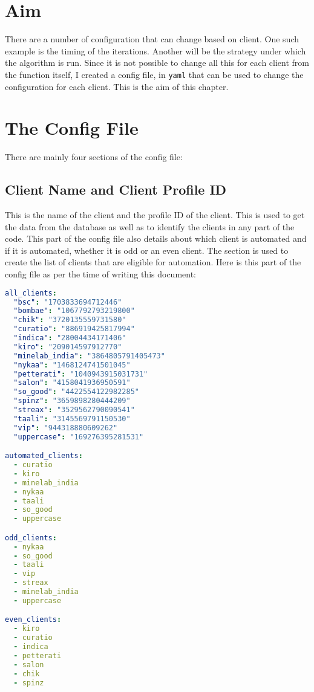 \section{Aim}

There are a number of configuration that can change based on client. One such example is the timing of the iterations. Another will be the strategy under which the algorithm is run. Since it is not possible to change all this for each client from the function itself, I created a config file, in \verb|yaml| that can be used to change the configuration for each client. This is the aim of this chapter.

\section{The Config File}

There are mainly four sections of the config file:

\subsection{Client Name and Client Profile ID}

This is the name of the client and the profile ID of the client. This is used to get the data from the database as well as to identify the clients in any part of the code. This part of the config file also details about which client is automated and if it is automated, whether it is odd or an even client. The section is used to create the list of clients that are eligible for automation. Here is this part of the config file as per the time of writing this document:

\begin{lstlisting}[language=yaml]
all_clients:
  "bsc": "1703833694712446"
  "bombae": "1067792793219800"
  "chik": "3720135559731580"
  "curatio": "886919425817994"
  "indica": "28004434171406"
  "kiro": "209014597912770"
  "minelab_india": "3864805791405473"
  "nykaa": "1468124741501045"
  "petterati": "1040943915031731"
  "salon": "4158041936950591"
  "so_good": "4422554122982285"
  "spinz": "3659898280444209"
  "streax": "3529562790090541"
  "taali": "3145569791150530"
  "vip": "944318880609262"
  "uppercase": "169276395281531"

automated_clients:
  - curatio
  - kiro
  - minelab_india
  - nykaa
  - taali
  - so_good
  - uppercase

odd_clients:
  - nykaa
  - so_good
  - taali
  - vip
  - streax
  - minelab_india
  - uppercase

even_clients:
  - kiro
  - curatio
  - indica
  - petterati
  - salon
  - chik
  - spinz
\end{lstlisting}

